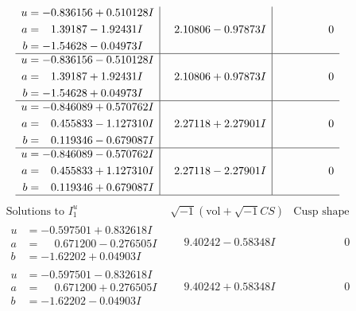 \documentclass[1p]{elsarticle_modified}
\theoremstyle{definition}
\newcommand{\I}{\sqrt{-1}}
\begin{document}
$$\begin{array}{c|c|c}
\begin{aligned}
u &= -0.836156 + 0.510128 I \\
a &= \phantom{-}1.39187 - 1.92431 I \\
b &= -1.54628 - 0.04973 I\end{aligned}
 & \phantom{-}2.10806 - 0.97873 I & \phantom{-0.000000 } 0 \\ \hline\begin{aligned}
u &= -0.836156 - 0.510128 I \\
a &= \phantom{-}1.39187 + 1.92431 I \\
b &= -1.54628 + 0.04973 I\end{aligned}
 & \phantom{-}2.10806 + 0.97873 I & \phantom{-0.000000 } 0 \\ \hline\begin{aligned}
u &= -0.846089 + 0.570762 I \\
a &= \phantom{-}0.455833 - 1.127310 I \\
b &= \phantom{-}0.119346 - 0.679087 I\end{aligned}
 & \phantom{-}2.27118 + 2.27901 I & \phantom{-0.000000 } 0 \\ \hline\begin{aligned}
u &= -0.846089 - 0.570762 I \\
a &= \phantom{-}0.455833 + 1.127310 I \\
b &= \phantom{-}0.119346 + 0.679087 I\end{aligned}
 & \phantom{-}2.27118 - 2.27901 I & \phantom{-0.000000 } 0\\
 \hline 
 \end{array}$$\newpage$$\begin{array}{c|c|c}  
\text{Solutions to }I^u_{1}& \I (\text{vol} + \sqrt{-1}CS) & \text{Cusp shape}\\
 \hline 
\begin{aligned}
u &= -0.597501 + 0.832618 I \\
a &= \phantom{-}0.671200 - 0.276505 I \\
b &= -1.62202 + 0.04903 I\end{aligned}
 & \phantom{-}9.40242 - 0.58348 I & \phantom{-0.000000 } 0 \\ \hline\begin{aligned}
u &= -0.597501 - 0.832618 I \\
a &= \phantom{-}0.671200 + 0.276505 I \\
b &= -1.62202 - 0.04903 I\end{aligned}
 & \phantom{-}9.40242 + 0.58348 I & \phantom{-0.000000 } 0 \\ \hline\begin{aligned}

\end{aligned}
\end{array}$$
\end{document}
